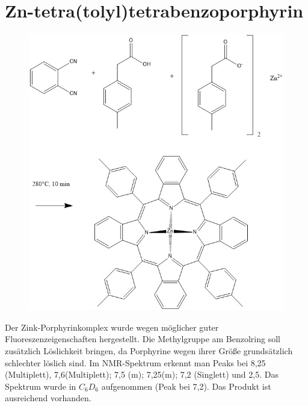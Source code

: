 \section{Zn-tetra(tolyl)tetrabenzoporphyrin}
\begin{figure}[!htpb]
\centering
\includegraphics[scale=0.5]{graphics/ZnTtolyltbp}
\end{figure}
Der Zink-Porphyrinkomplex wurde wegen möglicher guter Fluoreszenzeigenschaften hergestellt. Die Methylgruppe am Benzolring soll zusätzlich Löslichkeit bringen, da Porphyrine wegen ihrer Größe grundsätzlich schlechter löslich sind. 
Im NMR-Spektrum erkennt man Peaks bei 8,25 (Multiplett), 7,6(Multiplett); 7,5 (m); 7,25(m); 7,2 (Singlett) und 2,5. Das Spektrum wurde in $C_6D_6$ aufgenommen (Peak bei 7,2). Das Produkt ist ausreichend vorhanden.
\newpage
